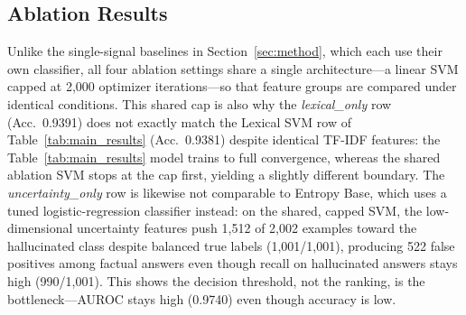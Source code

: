 \documentclass[conference]{IEEEtran}
\begin{document}
\begin{table}[t]
  \centering
  \caption{Validation vs.\ held-out test performance on HaluEval QA.}
  \label{tab:test_results}
  \renewcommand{\arraystretch}{1.1}
\end{table}

\subsection{Ablation Results}

Unlike the single-signal baselines in Section~\ref{sec:method}, which each use their own classifier, all four ablation settings share a single architecture---a linear SVM capped at 2{,}000 optimizer iterations---so that feature groups are compared under identical conditions. This shared cap is also why the \textit{lexical\_only} row (Acc.\ 0.9391) does not exactly match the Lexical SVM row of Table~\ref{tab:main_results} (Acc.\ 0.9381) despite identical TF-IDF features: the Table~\ref{tab:main_results} model trains to full convergence, whereas the shared ablation SVM stops at the cap first, yielding a slightly different boundary. The \textit{uncertainty\_only} row is likewise not comparable to Entropy Base, which uses a tuned logistic-regression classifier instead: on the shared, capped SVM, the low-dimensional uncertainty features push 1{,}512 of 2{,}002 examples toward the hallucinated class despite balanced true labels (1{,}001/1{,}001), producing 522 false positives among factual answers even though recall on hallucinated answers stays high (990/1{,}001). This shows the decision threshold, not the ranking, is the bottleneck---AUROC stays high (0.9740) even though accuracy is low.
\end{document}
